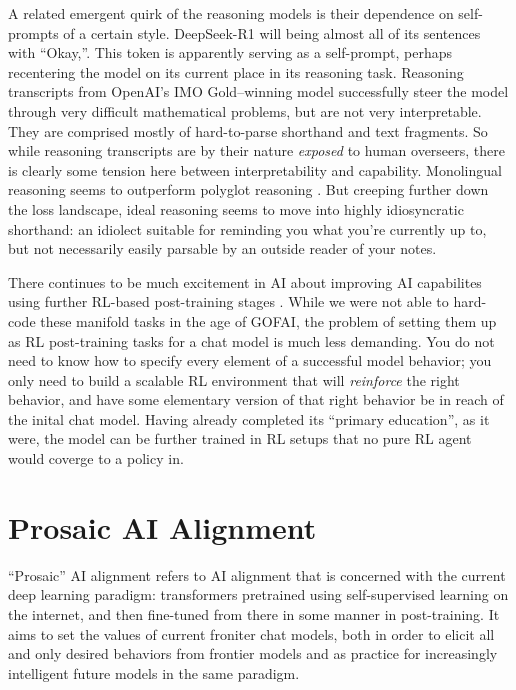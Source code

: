 A related emergent quirk of the reasoning models is their dependence on
self-prompts of a certain style. DeepSeek-R1 will being almost all of its
sentences with ``Okay,''. This token is apparently serving as a self-prompt,
perhaps recentering the model on its current place in its reasoning task.
Reasoning transcripts from OpenAI's IMO Gold--winning model successfully steer
the model through very difficult mathematical problems, but are not very
interpretable. They are comprised mostly of hard-to-parse shorthand and text
fragments. So while reasoning transcripts are by their nature \emph{exposed} to
human overseers, there is clearly some tension here between interpretability
and capability. Monolingual reasoning seems to outperform polyglot reasoning
\cite{}. But creeping further down the loss landscape, ideal reasoning seems to
move into highly idiosyncratic shorthand: an idiolect suitable for reminding
you what you're currently up to, but not necessarily easily parsable by an
outside reader of your notes.

There continues to be much excitement in AI about improving AI capabilites
using further RL-based post-training stages \cite{silver2025experience}. While
we were not able to hard-code these manifold tasks in the age of GOFAI, the
problem of setting them up as RL post-training tasks for a chat model is much
less demanding. You do not need to know how to specify every element of a
successful model behavior; you only need to build a scalable RL environment
that will \emph{reinforce} the right behavior, and have some elementary version
of that right behavior be in reach of the inital chat model. Having already
completed its ``primary education'', as it were, the model can be further
trained in RL setups that no pure RL agent would coverge to a policy in.

\section{Prosaic AI Alignment}
``Prosaic'' AI alignment refers to AI alignment that is concerned with the
current deep learning paradigm: transformers pretrained using self-supervised
learning on the internet, and then fine-tuned from there in some manner in
post-training. It aims to set the values of current froniter chat models, both
in order to elicit all and only desired behaviors from frontier models and as
practice for increasingly intelligent future models in the same paradigm.

